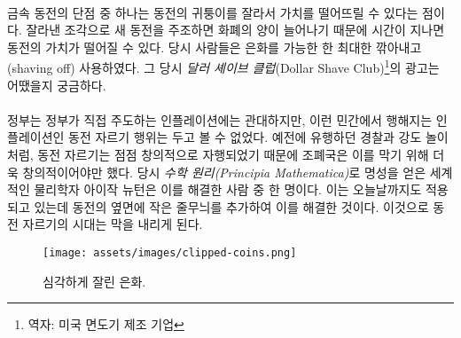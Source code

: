 \paragraph{}
\begin{comment}
	One of the downsides of using precious metal coins is that they can be
	clipped, effectively debasing the value of the coin. New coins can be
	minted from the clippings, inflating the money supply over time,
	devaluing every individual coin in the process. People were literally
	shaving off as much as they could get away with of their silver dollars.
	I wonder what kind of \textit{Dollar Shave Club} advertisements they had back
	in the day.
\end{comment}
금속 동전의 단점 중 하나는 동전의 귀퉁이를 잘라서 가치를 떨어뜨릴 수 있다는 점이다. 
잘라낸 조각으로 새 동전을 주조하면 화폐의 양이 늘어나기 때문에 시간이 지나면 동전의 가치가 떨어질 수 있다.
당시 사람들은 은화를 가능한 한 최대한 깎아내고(shaving off) 사용하였다.
그 당시 \textit{달러 셰이브 클럽}(Dollar Shave Club)\footnote{역자: 미국 면도기 제조 기업}의 광고는 어땠을지 궁금하다.

\paragraph{}
\begin{comment}
	Since governments are only cool with inflation if they are the ones
	doing it, efforts were made to stop this guerrilla debasement. In
	classic cops-and-robbers fashion, coin clippers got ever more creative
	with their techniques, forcing the \enquote{masters of the mint} to get even
	more creative with their countermeasures. Isaac Newton, the
	world-renowned physicist of \textit{Principia Mathematica} fame, used to be one
	of these masters. He is attributed with adding the small stripes at the
	side of coins which are still present today. Gone were the days of easy
	coin shaving.
\end{comment}
정부는 정부가 직접 주도하는 인플레이션에는 관대하지만, 
이런 민간에서 행해지는 인플레이션인 동전 자르기 행위는 두고 볼 수 없었다. 
예전에 유행하던 경찰과 강도 놀이처럼, 
동전 자르기는 점점 창의적으로 자행되었기 때문에 조폐국은 이를 막기 위해 더욱 창의적이어야만 했다.
당시 \textit{수학 원리(Principia Mathematica)}로 명성을 얻은 세계적인 물리학자 아이작 뉴턴은 이를 해결한 사람 중 한 명이다. 
이는 오늘날까지도 적용되고 있는데 동전의 옆면에 작은 줄무늬를 추가하여 이를 해결한 것이다.
이것으로 동전 자르기의 시대는 막을 내리게 된다.

\begin{figure}
	\texttt{[image: assets/images/clipped-coins.png]}
	\caption{심각하게 잘린 은화.}
	\label{fig:clipped-coins}
\end{figure}

